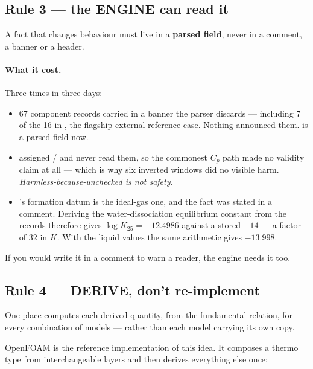\documentclass[11pt,a4paper]{article}
\begin{document}
\subsection{Rule 3 --- the ENGINE can read it}

A fact that changes behaviour must live in a \textbf{parsed field}, never in a
comment, a banner or a header.

\paragraph{What it cost.} Three times in three days:

\begin{itemize}[leftmargin=*]
  \item 67 component records carried  in a
        banner the parser discards --- including 7 of the 16 in
        , the flagship external-reference case. Nothing
        announced them.  is a parsed field now.
  \item {} assigned / and never
        read them, so the commonest $C_p$ path made no validity claim at all
        --- which is why six inverted windows did no visible harm.
        \emph{Harmless-because-unchecked is not safety.}
  \item {}'s formation datum is the ideal-gas one, and the fact
        was stated in a comment. Deriving the water-dissociation equilibrium
        constant from the records therefore gives $\log K_{25} = -12.4986$
        against a stored $-14$ --- a factor of 32 in $K$. With the liquid
        values the same arithmetic gives $-13.998$.
\end{itemize}

\begin{keyidea}
If you would write it in a comment to warn a reader, the engine needs it too.
\end{keyidea}

\subsection{Rule 4 --- DERIVE, don't re-implement}

One place computes each derived quantity, from the fundamental relation, for
every combination of models --- rather than each model carrying its own copy.

OpenFOAM is the reference implementation of this idea. It composes a thermo
type from interchangeable layers and then derives everything else once:
\end{document}
